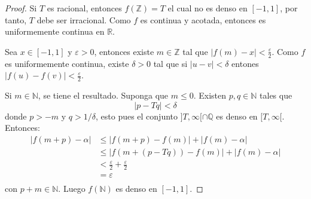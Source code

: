 \documentclass[12pt]{report}
\theoremstyle{largebreak}
\newcommand\abs[1]{\ensuremath{\big|#1\big|}}
\begin{document}
    \begin{proof}
        Si $T$ es racional, entonces $f(\mathbb{Z})={T}$ el cual no es denso en $[-1,1]$, por tanto, $T$ debe ser irracional. Como $f$ es continua y acotada, entonces es uniformemente continua en $\mathbb{R}$.

        Sea $x\in[-1,1]$ y $\varepsilon>0$, entonces existe $m\in\mathbb{Z}$ tal que $\abs{f(m)-x}<\frac{\varepsilon}{2}$. Como $f$ es uniformemente continua, existe $\delta>0$ tal que si $\abs{u-v}<\delta$ entones $\abs{f(u)-f(v)}<\frac{\varepsilon}{2}$.

        Si $m\in\mathbb{N}$, se tiene el resultado. Suponga que $m\leq 0$. Existen $p,q\in\mathbb{N}$ tales que
        \begin{equation*}
            \abs{p-Tq}<\delta
        \end{equation*}
        donde $p>-m$ y $q>1/\delta$, esto pues el conjunto $]T,\infty[\cap\mathbb{Q}$ es denso en $[T,\infty[$. Entonces:
        \begin{equation*}
            \begin{split}
                \abs{f(m+p)-\alpha}&\leq\abs{f(m+p)-f(m)}+\abs{f(m)-\alpha} \\
                &\leq\abs{f(m+(p-Tq))-f(m)}+\abs{f(m)-\alpha} \\
                &<\frac{\varepsilon}{2}+\frac{\varepsilon}{2}\\
                &=\varepsilon\\
            \end{split}
        \end{equation*}
        con $p+m\in\mathbb{N}$. Luego $f(\mathbb{N})$ es denso en $[-1,1]$.

    \end{proof}
\end{document}
